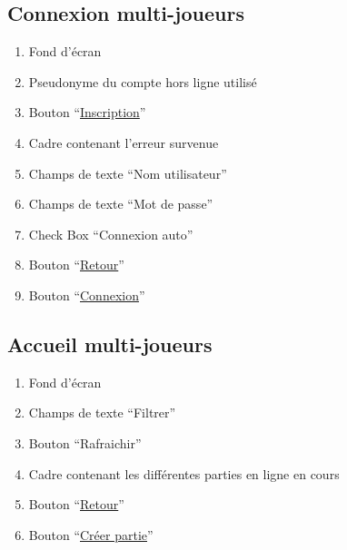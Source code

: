 \documentclass{report}
\begin{document}
\newpage

	\subsection{Connexion multi-joueurs}
	
		\hypertarget{Connexion multi-joueurs}{}
		\label{Connexion multi-joueurs}
	
		
		
		\begin{enumerate}
		  \item Fond d'écran
		  \item Pseudonyme du compte hors ligne utilisé
		  \item Bouton ``\hyperlink{Creation compte multi-joueurs}{Inscription}''
		  \item Cadre contenant l'erreur survenue
		  \item Champs de texte ``Nom utilisateur''
		  \item Champs de texte ``Mot de passe''
		  \item Check Box ``Connexion auto''
		  \item Bouton ``\hyperlink{Page d'accueil}{Retour}''
		  \item Bouton ``\hyperlink{Accueil multi-joueurs}{Connexion}''
		\end{enumerate}
		
		
\newpage

	\subsection{Accueil multi-joueurs}

		\hypertarget{Accueil multi-joueurs}{}
		\label{Accueil multi-joueurs}
	
		
		
		\begin{enumerate}
		  \item Fond d'écran
		  \item Champs de texte ``Filtrer''
		  \item Bouton ``Rafraichir''
		  \item Cadre contenant les différentes parties en ligne en cours
		  \item Bouton ``\hyperlink{Page d'accueil}{Retour}''
		  \item Bouton ``\hyperlink{Creer partie multi-joueurs}{Créer partie}''
		\end{enumerate}
	
\end{document}
